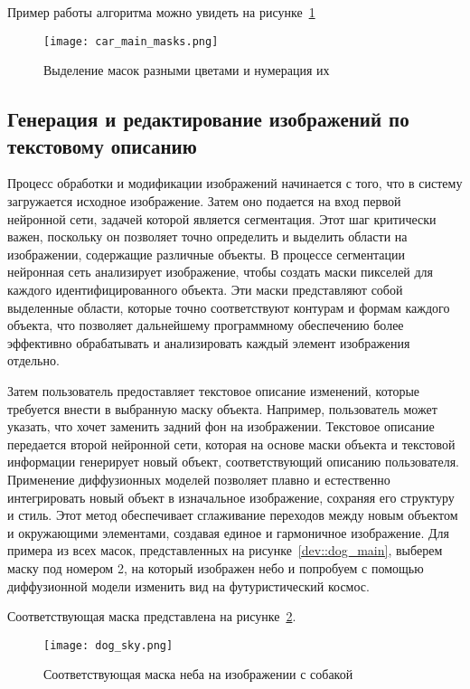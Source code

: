 Пример работы алгоритма можно увидеть на рисунке~\ref{dev::masks}

\begin{figure}[ht]
    \centering
    \texttt{[image: car\_main\_masks.png]}
    \caption{Выделение масок разными цветами и нумерация их}
    \label{dev::masks}
\end{figure}


\subsection{Генерация и редактирование изображений по текстовому описанию}

Процесс обработки и модификации изображений начинается с того, что в систему загружается исходное изображение. Затем оно подается на вход первой нейронной сети, задачей которой является сегментация. Этот шаг критически важен, поскольку он позволяет точно определить и выделить области на изображении, содержащие различные объекты. В процессе сегментации нейронная сеть анализирует изображение, чтобы создать маски пикселей для каждого идентифицированного объекта. Эти маски представляют собой выделенные области, которые точно соответствуют контурам и формам каждого объекта, что позволяет дальнейшему программному обеспечению более эффективно обрабатывать и анализировать каждый элемент изображения отдельно. 

Затем пользователь предоставляет текстовое описание изменений, 
которые требуется внести в выбранную маску объекта. Например, 
пользователь может указать, что хочет заменить задний фон на изображении. 
Текстовое описание передается второй нейронной сети, которая на основе 
маски объекта и текстовой информации генерирует новый объект, 
соответствующий описанию пользователя.
Применение диффузионных моделей позволяет плавно и естественно 
интегрировать новый объект в изначальное изображение, сохраняя его структуру и стиль. Этот метод обеспечивает сглаживание переходов между 
новым объектом и окружающими элементами, создавая единое и гармоничное 
изображение.
Для примера из всех масок, представленных на рисунке~\ref{dev::dog_main}, выберем 
маску под номером 2, на который изображен небо и попробуем с 
помощью диффузионной модели изменить вид на футуристический космос. 

Соответствующая маска представлена на рисунке~\ref{dev::dog_sky}.

\begin{figure}[ht]
    \centering
    \texttt{[image: dog\_sky.png]}
    \caption{Соответствующая маска неба на изображении с собакой}
    \label{dev::dog_sky}
\end{figure}


